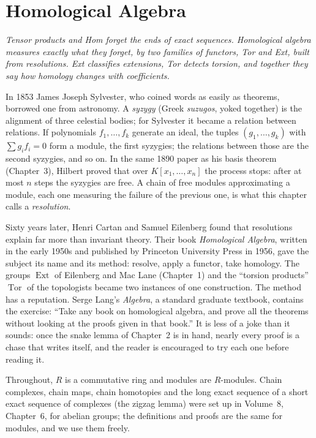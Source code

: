 \chapter{Homological Algebra}

\begin{center}\itshape
Tensor products and Hom forget the ends of exact sequences. Homological algebra measures exactly what they forget, by two families of functors, Tor and Ext, built from resolutions. Ext classifies extensions,
Tor detects torsion, and together they say how homology changes with coefficients.
\end{center}

In 1853 James Joseph Sylvester, who coined words as easily as theorems, borrowed one from astronomy. A \emph{syzygy} (Greek \emph{suzugos}, yoked together) is the alignment of three celestial bodies; for
Sylvester it became a relation between relations. If polynomials $f_1,\dots,f_k$ generate an ideal, the tuples $(g_1,\dots,g_k)$ with $\sum g_if_i=0$ form a module, the first syzygies; the relations between
those are the second syzygies, and so on. In the same 1890 paper as his basis theorem (Chapter~3), Hilbert proved that over $K[x_1,\dots,x_n]$ the process stops: after at most $n$ steps the syzygies are free. A chain of
free modules approximating a module, each one measuring the failure of the previous one, is what this chapter calls a \emph{resolution}.

Sixty years later, Henri Cartan and Samuel Eilenberg found that resolutions explain far more than invariant theory. Their book \emph{Homological Algebra}, written in the early 1950s and published by Princeton
University Press in 1956, gave the subject its name and its method: resolve, apply a functor, take homology. The groups $\operatorname{Ext}$ of Eilenberg and Mac Lane (Chapter~1) and the ``torsion products''
$\operatorname{Tor}$ of the topologists became two instances of one construction. The method has a reputation. Serge Lang's \emph{Algebra}, a standard graduate textbook, contains the exercise: ``Take any book on
homological algebra, and prove all the theorems without looking at the proofs given in that book.'' It is less of a joke than it sounds: once the snake lemma of Chapter~2 is in hand, nearly every proof is a chase that
writes itself, and the reader is encouraged to try each one before reading it.

Throughout, $R$ is a commutative ring and modules are $R$-modules. Chain complexes, chain maps, chain homotopies and the long exact sequence of a short exact sequence of complexes (the zigzag lemma) were set up in
Volume~8, Chapter~6, for abelian groups; the definitions and proofs are the same for modules, and we use them freely.

